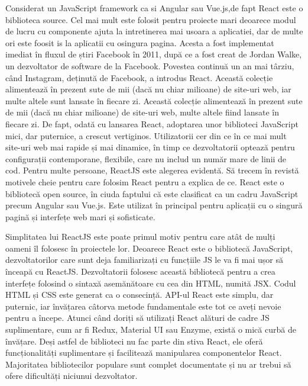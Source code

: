 \par  Considerat un JavaScript framework ca si Angular sau Vue.js,de fapt React este o biblioteca source. Cel mai mult este folosit pentru proiecte mari deoarece modul de lucru cu componente ajuta la intretinerea mai usoara a aplicatiei, dar de multe ori este foosit is la aplicatii cu osingura pagina. Acesta a fost implementat imediat în fluxul de știri Facebook în 2011, după ce a fost creat de Jordan Walke, un dezvoltator de software de la Facebook. Povestea continuă un an mai târziu, când Instagram, deținută de Facebook, a introdus React. Această colecție alimentează în prezent sute de mii (dacă nu chiar milioane) de site-uri web, iar multe altele sunt lansate în fiecare zi. Această colecție alimentează în prezent sute de mii (dacă nu chiar milioane) de site-uri web, multe altele fiind lansate în fiecare zi. De fapt, odată cu lansarea React, adoptarea unor biblioteci JavaScript mici, dar puternice, a crescut vertiginos. Utilizatorii cer din ce în ce mai mult site-uri web mai rapide și mai dinamice, în timp ce dezvoltatorii optează pentru configurații contemporane, flexibile, care nu includ un număr mare de linii de cod. Pentru multe persoane, ReactJS este alegerea evidentă. Să trecem în revistă motivele cheie pentru care folosim React pentru a explica de ce. React este o bibliotecă open source, în ciuda faptului că este clasificat ca un cadru JavaScript precum Angular sau Vue.js. Este utilizat în principal pentru aplicații cu o singură pagină și interfețe web mari și sofisticate.

\par Simplitatea lui ReactJS este poate primul motiv pentru care atât de mulți oameni îl folosesc în proiectele lor. Deoarece React este o bibliotecă JavaScript, dezvoltatorilor care sunt deja familiarizați cu funcțiile JS le va fi mai ușor să înceapă cu ReactJS. Dezvoltatorii folosesc această bibliotecă pentru a crea interfețe folosind o sintaxă asemănătoare cu cea din HTML, numită JSX. Codul HTML și CSS este generat ca o consecință. API-ul React este simplu, dar puternic, iar învățarea câtorva metode fundamentale este tot ce aveți nevoie pentru a începe. Atunci când doriți să utilizați React alături de cadre JS suplimentare, cum ar fi Redux, Material UI sau Enzyme, există o mică curbă de învățare. Deși astfel de biblioteci nu fac parte din stiva React, ele oferă funcționalități suplimentare și facilitează manipularea componentelor React. Majoritatea bibliotecilor populare sunt complet documentate și nu ar trebui să ofere dificultăți niciunui dezvoltator.


